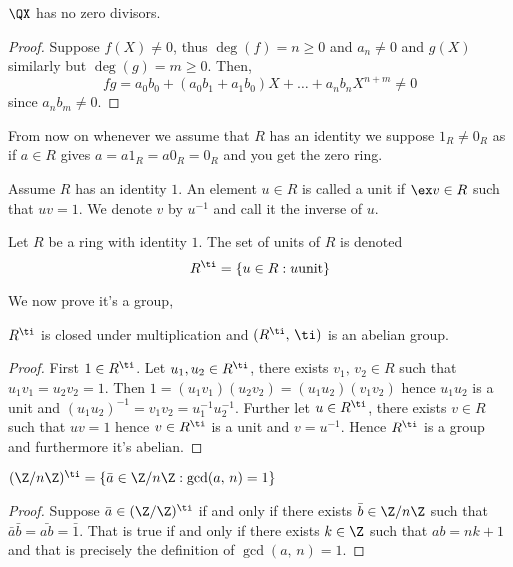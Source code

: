 \begin{nprop}
   $\QX$ has no zero divisors.
\end{nprop}
\begin{proof}
  Suppose $f(X) \ne 0$, thus $\deg(f) = n \ge 0$ and $a_n \ne 0$ and $g(X)$ similarly but $\deg(g) = m \ge 0$. Then,
  $$ fg = a_0b_0 + (a_0b_1 + a_1b_0)X + \dots + a_nb_n X^{n+m} \ne 0$$
  since $a_n b_m \ne 0$.
\end{proof}

From now on whenever we assume that $R$ has an identity we suppose $1_R \ne 0_R$ as if $a \in R$ gives $a = a1_R = a0_R = 0_R$ and you get the zero ring.

\begin{ndefi}[Unit]
  Assume $R$ has an identity $1$. An element $u \in R$ is called a unit if $\ex v \in R$ such that $uv = 1$. We denote $v$ by $u^{-1}$ and call it the inverse of $u$.
\end{ndefi}

\begin{ndefi}
  Let $R$ be a ring with identity $1$. The set of units of $R$ is denoted
  $$ R^\ti = \{u \in R : u \text{unit}\} $$
\end{ndefi}

We now prove it's a group,

\begin{nlemma}
  $R^\ti$ is closed under multiplication and $(R^\ti,\,\ti)$ is an abelian group.
\end{nlemma}
\begin{proof}
  First $1 \in R^\ti$. Let $u_1, u_2 \in R^\ti$, there exists $v_1,\,v_2 \in R$ such that $u_1v_1 = u_2v_2 = 1$. Then $1 = (u_1v_1)(u_2v_2) = (u_1u_2)(v_1v_2)$ hence $u_1u_2$ is a unit and $(u_1u_2)^{-1} = v_1v_2 = u_1^{-1}u_2^{-1}$.
  Further let $u \in R^\ti$, there exists $v \in R$ such that $uv = 1$ hence $v \in R^\ti$ is a unit and $v= u^{-1}$. Hence $R^\ti$ is a group and furthermore it's abelian.
\end{proof}

\begin{nprop}
   $(\Z/n\Z)^\ti = \{\bar a \in \Z/n\Z : \gcd(a,\,n) = 1\}$
\end{nprop}
\begin{proof}
  Suppose $\bar a \in (\Z/\Z)^\ti$ if and only if there exists $\bar b \in \Z/n\Z$ such that $\bar{a}\bar{b} = \bar{ab} = \bar 1$. That is true if and only if there exists $k \in \Z$ such that $ab = nk + 1$ and that is precisely the definition of $\gcd(a,\,n) = 1$.
\end{proof}
